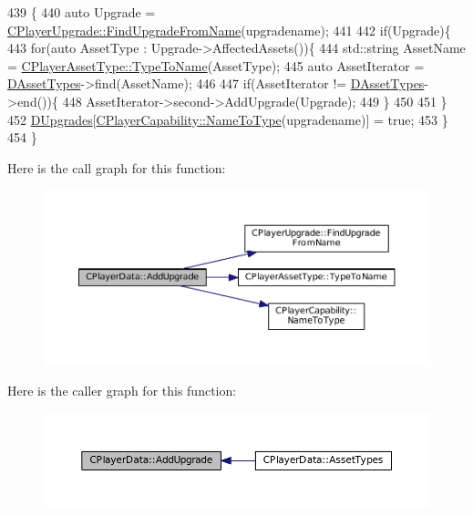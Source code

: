 \begin{DoxyCode}
439                                                         \{
440     \textcolor{keyword}{auto} Upgrade = \hyperlink{classCPlayerUpgrade_af47a08aba3a1a5b2cefacef24065a82e}{CPlayerUpgrade::FindUpgradeFromName}(upgradename);
441     
442     \textcolor{keywordflow}{if}(Upgrade)\{
443         \textcolor{keywordflow}{for}(\textcolor{keyword}{auto} AssetType : Upgrade->AffectedAssets())\{
444             std::string AssetName = \hyperlink{classCPlayerAssetType_a66ce89c35b74940e9fc947a1f4b9e770}{CPlayerAssetType::TypeToName}(AssetType);
445             \textcolor{keyword}{auto} AssetIterator = \hyperlink{classCPlayerData_ad922f283c60b1c885dac955815ae2b05}{DAssetTypes}->find(AssetName);
446             
447             \textcolor{keywordflow}{if}(AssetIterator != \hyperlink{classCPlayerData_ad922f283c60b1c885dac955815ae2b05}{DAssetTypes}->end())\{
448                 AssetIterator->second->AddUpgrade(Upgrade);
449             \}
450             
451         \}
452         \hyperlink{classCPlayerData_ae7cb90c31ec46b65ba88485368a4b96a}{DUpgrades}[\hyperlink{classCPlayerCapability_a920a696526e8a839f728192aea0ba1c5}{CPlayerCapability::NameToType}(upgradename)] = \textcolor{keyword}{true};
453     \}
454 \}
\end{DoxyCode}
Here is the call graph for this function\+:\nopagebreak
\begin{figure}[H]
\begin{center}
\leavevmode
\includegraphics[width=350pt]{classCPlayerData_ae66fe7d594267990adf34f9286925efb_cgraph}
\end{center}
\end{figure}
Here is the caller graph for this function\+:\nopagebreak
\begin{figure}[H]
\begin{center}
\leavevmode
\includegraphics[width=350pt]{classCPlayerData_ae66fe7d594267990adf34f9286925efb_icgraph}
\end{center}
\end{figure}
\hypertarget{classCPlayerData_a058ba3a3acf824fe4707d5e8a5024806}{}\label{classCPlayerData_a058ba3a3acf824fe4707d5e8a5024806} 
